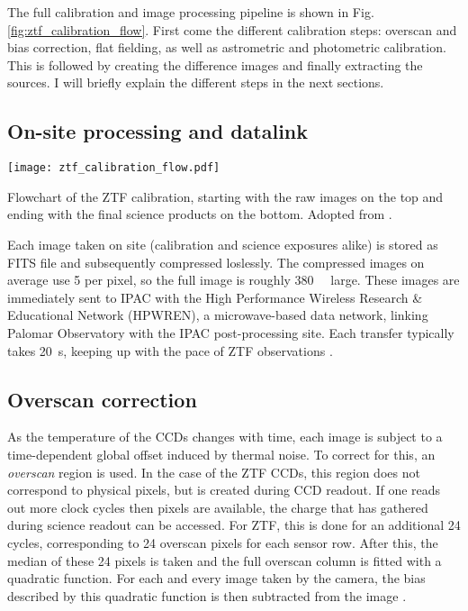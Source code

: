 The full calibration and image processing pipeline is shown in Fig. \ref{fig:ztf_calibration_flow}. First come the different calibration steps: overscan and bias correction, flat fielding, as well as astrometric and photometric calibration. This is followed by creating the difference images and finally extracting the sources. I will briefly explain the different steps in the next sections.

\subsection{On-site processing and datalink}\label{ztf_data_link}

\begin{marginfigure}
    \texttt{[image: ztf\_calibration\_flow.pdf]}
    \caption[ZTF realtime flowchart]{Flowchart of the ZTF calibration, starting with the raw images on the top and ending with the final science products on the bottom. Adopted from \cite{Laher2018}.}
\end{marginfigure}

Each image taken on site (calibration and science exposures alike) is stored as FITS file and subsequently compressed loslessly. The compressed images on average use \SI{5}{\bit} per pixel, so the full image is roughly \SI{380}{\mega\byte} large. These images are immediately sent to IPAC with the High Performance Wireless Research \& Educational Network (HPWREN), a microwave-based data network, linking Palomar Observatory with the IPAC post-processing site. Each transfer typically takes \SI{20}{\second}, keeping up with the pace of ZTF observations \cite{Dekany2020}.

\subsection{Overscan correction}
As the temperature of the CCDs changes with time, each image is subject to a time-dependent global offset induced by thermal noise. To correct for this, an \textit{overscan} region is used. In the case of the ZTF CCDs, this region does not correspond to physical pixels, but is created during CCD readout. If one reads out more clock cycles then pixels are available, the charge that has gathered during science readout can be accessed. For ZTF, this is done for an additional 24 cycles, corresponding to 24 overscan pixels for each sensor row. After this, the median of these 24 pixels is taken and the full overscan column is fitted with a quadratic function. For each and every image taken by the camera, the bias described by this quadratic function is then subtracted from the image \cite{Masci2019a}.

